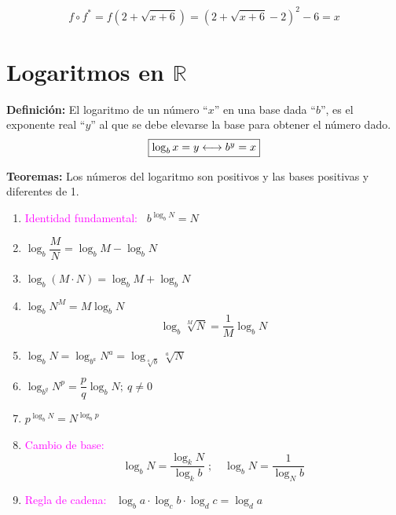 \documentclass[11pt,a4paper]{article}
\begin{document}
\[
f\circ f^* = f(2 + \sqrt{x + 6}) = (2 + \sqrt{x + 6} - 2)^2 - 6 = x
\]


\newpage
\section{Logaritmos en $\mathbb{R}$}

\textbf{Definición:} El logaritmo de un número ``$x$'' en una base dada ``$b$'', es el exponente
real ``$y$'' al que se debe elevarse la base para obtener el número dado.
\[\fbox{$\log_b x = y \longleftrightarrow b^y = x$}\]
\begin{center}
\end{center}

\textbf{Teoremas:} Los números del logaritmo son positivos y las bases positivas y diferentes
de 1.

\begin{minipage}[t]{0.485\textwidth}
\begin{enumerate}
  \item \textcolor{magenta}{Identidad fundamental:} \ $b^{\log_b N} = N$
  \item $\log_b \dfrac{M}{N} = \log_b M - \log_b N$
  \item $\log_b (M\cdot N) = \log_b M + \log_b N$
  \item $\log_b N^M = M\log_b N$
  \[\log_b \sqrt[M]{N} = \frac{1}{M}\log_b N\]
\end{enumerate}
\end{minipage}\hfill
\begin{minipage}[t]{0.485\textwidth}
\begin{enumerate}\setcounter{enumi}{4}
  \item $\log_b N = \log_{b^a} N^a = \log_{\sqrt[a]{b}} \sqrt[a]{N}$
  \item $\log_{b^q} N^p = \dfrac{p}{q}\log_b N;\ q \neq 0$
  \item $p^{\log_b N} = N^{\log_b p}$
  \item \textcolor{magenta}{Cambio de base:}
  \[\log_b N = \frac{\log_k N}{\log_k b}\;; \quad \log_b N = \frac{1}{\log_N b}\]
\end{enumerate}
\end{minipage}
\begin{enumerate}\setcounter{enumi}{8}
  \item \textcolor{magenta}{Regla de cadena:} \ $\log_b a\cdot\log_c b\cdot\log_d c = \log_d a$
\end{enumerate}
\end{document}
